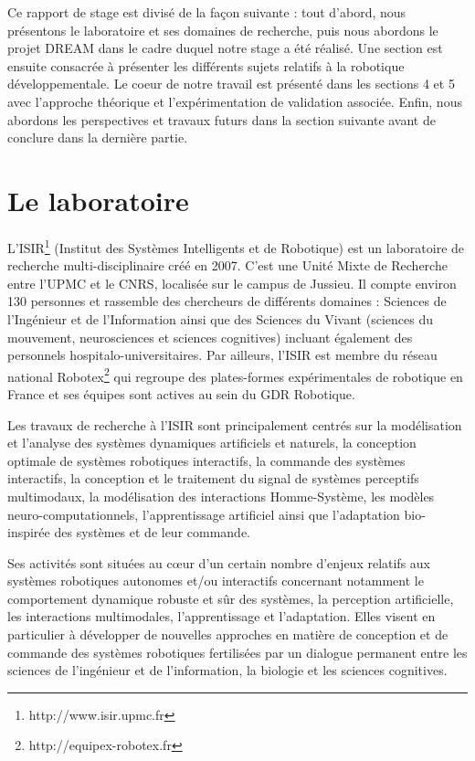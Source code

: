 \documentclass{llncs}
\begin{document}
Ce rapport de stage est divisé de la façon suivante : tout d'abord, nous présentons le laboratoire et ses domaines de recherche, puis nous abordons le projet DREAM dans le cadre duquel notre stage a été réalisé.
Une section est ensuite consacrée à présenter les différents sujets relatifs à la robotique développementale.
Le coeur de notre travail est présenté dans les sections 4 et 5 avec l'approche théorique et l'expérimentation de validation associée.
Enfin, nous abordons les perspectives et travaux futurs dans la section suivante avant de conclure dans la dernière partie.


\section{Le laboratoire}

\lettrine{L}{'ISIR}\footnote{http://www.isir.upmc.fr} (Institut des Systèmes Intelligents et de Robotique) est un laboratoire de recherche multi-disciplinaire créé en 2007.
C'est une Unité Mixte de Recherche entre l'UPMC et le CNRS, localisée sur le campus de Jussieu.
Il compte environ 130 personnes et rassemble des chercheurs de différents domaines : Sciences de l’Ingénieur et de l’Information ainsi que des Sciences du Vivant (sciences du mouvement, neurosciences et sciences cognitives) incluant également des personnels hospitalo-universitaires.
Par ailleurs, l'ISIR est membre du réseau national Robotex\footnote{http://equipex-robotex.fr} qui regroupe des plates-formes expérimentales de robotique en France et ses équipes sont actives au sein du GDR Robotique.

Les travaux de recherche à l'ISIR sont principalement centrés sur la modélisation et l'analyse des systèmes dynamiques artificiels et naturels, la conception optimale de systèmes robotiques interactifs, la commande des systèmes interactifs, la conception et le traitement du signal de systèmes perceptifs multimodaux, la modélisation des interactions Homme-Système, les modèles neuro-computationnels, l'apprentissage artificiel ainsi que l'adaptation bio-inspirée des systèmes et de leur commande. 

Ses activités sont situées au cœur d’un certain nombre d’enjeux relatifs aux systèmes robotiques autonomes et/ou interactifs concernant notamment le comportement dynamique robuste et sûr des systèmes, la perception artificielle, les interactions multimodales, l’apprentissage et l’adaptation.
Elles visent en particulier à développer de nouvelles approches en matière de conception et de commande des systèmes robotiques fertilisées par un dialogue permanent entre les sciences de l’ingénieur et de l’information, la biologie et les sciences cognitives.
\end{document}
